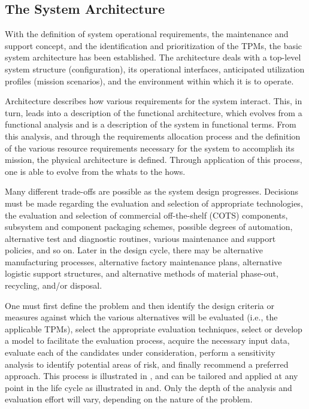 \subsection{The System Architecture}

With the definition of system operational requirements, the maintenance and support concept, and the identification and prioritization of the TPMs, the basic system architecture has been established. The architecture deals with a top-level system structure (configuration), its operational interfaces, anticipated utilization profiles (mission scenarios), and the environment within which it is to operate.

Architecture describes how various requirements for the system interact. This, in turn, leads into a description of the functional architecture, which evolves from a functional analysis and is a description of the system in functional terms. From this analysis, and through the requirements allocation process and the definition of the various resource requirements necessary for the system to accomplish its mission, the physical architecture is defined. Through application of this process, one is able to evolve from the whats to the hows.

Many different trade-offs are possible as the system design progresses. Decisions must be made regarding the evaluation and selection of appropriate technologies, the evaluation and selection of commercial off-the-shelf (COTS) components, subsystem and component packaging schemes, possible degrees of automation, alternative test and diagnostic routines, various maintenance and support policies, and so on. Later in the design cycle, there may be alternative manufacturing processes, alternative factory maintenance plans, alternative logistic support structures, and alternative methods of material phase-out, recycling, and/or disposal.

One must first define the problem and then identify the design criteria or measures against which the various alternatives will be evaluated (i.e., the applicable TPMs), select the appropriate evaluation techniques, select or develop a model to facilitate the evaluation process, acquire the necessary input data, evaluate each of the candidates under consideration, perform a sensitivity analysis to identify potential areas of risk, and finally recommend a preferred approach. This process is illustrated in , and can be tailored and applied at any point in the life cycle as illustrated in and. Only the depth of the analysis and evaluation effort will vary, depending on the nature of the problem.

